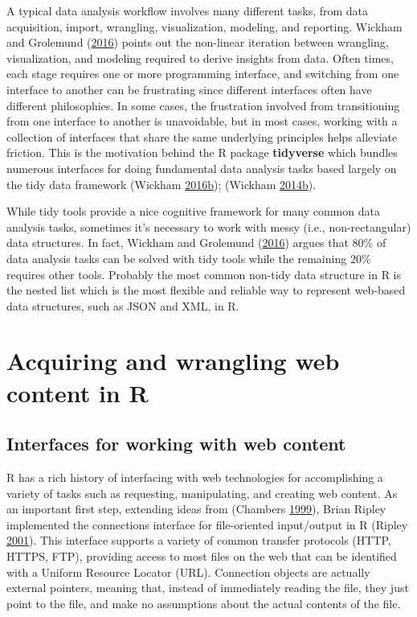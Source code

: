 \documentclass[12pt,]{isuthesis}
\begin{document}
A typical data analysis workflow involves many different tasks, from
data acquisition, import, wrangling, visualization, modeling, and
reporting. Wickham and Grolemund (\protect\hyperlink{ref-r4ds}{2016})
points out the non-linear iteration between wrangling, visualization,
and modeling required to derive insights from data. Often times, each
stage requires one or more programming interface, and switching from one
interface to another can be frustrating since different interfaces often
have different philosophies. In some cases, the frustration involved
from transitioning from one interface to another is unavoidable, but in
most cases, working with a collection of interfaces that share the same
underlying principles helps alleviate friction. This is the motivation
behind the R package \textbf{tidyverse} which bundles numerous
interfaces for doing fundamental data analysis tasks based largely on
the tidy data framework (Wickham
\protect\hyperlink{ref-tidyverse}{2016}\protect\hyperlink{ref-tidyverse}{b});
(Wickham
\protect\hyperlink{ref-tidy-data}{2014}\protect\hyperlink{ref-tidy-data}{b}).

While tidy tools provide a nice cognitive framework for many common data
analysis tasks, sometimes it's necessary to work with messy (i.e.,
non-rectangular) data structures. In fact, Wickham and Grolemund
(\protect\hyperlink{ref-r4ds}{2016}) argues that 80\% of data analysis
tasks can be solved with tidy tools while the remaining 20\% requires
other tools. Probably the most common non-tidy data structure in R is
the nested list which is the most flexible and reliable way to represent
web-based data structures, such as JSON and XML, in R.

\section{Acquiring and wrangling web content in
R}\label{acquiring-and-wrangling-web-content-in-r}

\subsection{Interfaces for working with web
content}\label{interfaces-for-working-with-web-content}

R has a rich history of interfacing with web technologies for
accomplishing a variety of tasks such as requesting, manipulating, and
creating web content. As an important first step, extending ideas from
(Chambers \protect\hyperlink{ref-Chambers:1999}{1999}), Brian Ripley
implemented the connections interface for file-oriented input/output in
R (Ripley \protect\hyperlink{ref-Connections}{2001}). This interface
supports a variety of common transfer protocols (HTTP, HTTPS, FTP),
providing access to most files on the web that can be identified with a
Uniform Resource Locator (URL). Connection objects are actually external
pointers, meaning that, instead of immediately reading the file, they
just point to the file, and make no assumptions about the actual
contents of the file.
\end{document}
